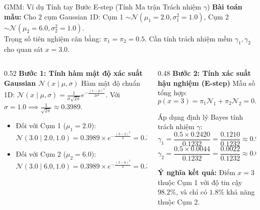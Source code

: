 \documentclass[aspectratio=169,10pt]{beamer}
\begin{document}
\begin{frame}{GMM: Ví dụ Tính tay Bước E-step (Tính Ma trận Trách nhiệm $\gamma$)}
  \scriptsize
  \textbf{Bài toán mẫu:} Cho 2 cụm Gaussian 1D: Cụm 1 $\sim \mathcal{N}(\mu_1=2.0, \sigma_1^2=1.0)$, Cụm 2 $\sim \mathcal{N}(\mu_2=6.0, \sigma_2^2=1.0)$.\\
  Trọng số tiên nghiệm cân bằng: $\pi_1 = \pi_2 = 0.5$. Cần tính trách nhiệm mềm $\gamma_1, \gamma_2$ cho quan sát $x = 3.0$.
  
  \vspace{0.4em}
  \begin{columns}[T]
    \begin{column}{0.52\textwidth}
      \textbf{Bước 1: Tính hàm mật độ xác suất Gaussian $\mathcal{N}(x \mid \mu, \sigma)$}
      Hàm mật độ chuẩn 1D: $\mathcal{N}(x \mid \mu, \sigma) = \frac{1}{\sigma \sqrt{2\pi}} e^{-\frac{(x - \mu)^2}{2\sigma^2}}$.
      Với $\sigma=1.0 \implies \frac{1}{\sqrt{2\pi}} \approx 0.3989$.
      \begin{itemize}\setlength{\itemsep}{2pt}
        \item Đối với Cụm 1 ($\mu_1 = 2.0$):
          $$\mathcal{N}(3.0 \mid 2.0, 1.0) = 0.3989 \times e^{-\frac{(3-2)^2}{2}} = 0.3989 \times e^{-0.5} \approx \mathbf{0.2420}$$
        \item Đối với Cụm 2 ($\mu_2 = 6.0$):
          $$\mathcal{N}(3.0 \mid 6.0, 1.0) = 0.3989 \times e^{-\frac{(3-6)^2}{2}} = 0.3989 \times e^{-4.5} \approx \mathbf{0.0044}$$
      \end{itemize}
    \end{column}
    \begin{column}{0.48\textwidth}
      \textbf{Bước 2: Tính xác suất hậu nghiệm (E-step)}
      Mẫu số tổng hợp:
      $$p(x=3) = \pi_1 \mathcal{N}_1 + \pi_2 \mathcal{N}_2 = 0.5(0.2420) + 0.5(0.0044) = \mathbf{0.1232}$$
      
      Áp dụng định lý Bayes tính trách nhiệm $\gamma$:
      $$\gamma_1 = \frac{0.5 \times 0.2420}{0.1232} = \frac{0.1210}{0.1232} \approx \mathbf{0.982\ (98.2\%)}$$
      $$\gamma_2 = \frac{0.5 \times 0.0044}{0.1232} = \frac{0.0022}{0.1232} \approx \mathbf{0.018\ (1.8\%)}$$
      
      \textbf{Ý nghĩa kết quả:} Điểm $x=3$ thuộc Cụm 1 với độ tin cậy $98.2\%$, và chỉ có $1.8\%$ khả năng thuộc Cụm 2.
    \end{column}
  \end{columns}
\end{frame}
\end{document}
